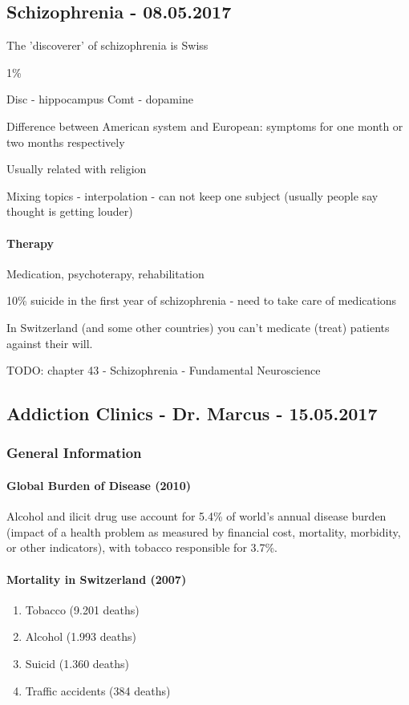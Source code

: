 \documentclass[12pt,article,oneside,a4paper]{memoir}
\begin{document}
\subsection{Schizophrenia - 08.05.2017}

The 'discoverer' of schizophrenia is Swiss

1\%

Disc - hippocampus
Comt - dopamine

Difference between American system and European: symptoms for one month or two months respectively

Usually related with religion

Mixing topics - interpolation - can not keep one subject (usually people say thought is getting louder)

\paragraph{Therapy}
Medication, psychoterapy, rehabilitation

10\% suicide in the first year of schizophrenia - need to take care of medications

In Switzerland (and some other countries) you can't medicate (treat) patients against their will.

TODO: chapter 43 - Schizophrenia - Fundamental Neuroscience
\newpage
\subsection{Addiction Clinics - Dr. Marcus - 15.05.2017}

\subsubsection{General Information}
\paragraph{Global Burden of Disease (2010)} Alcohol and ilicit drug use account for 5.4\% of world's annual disease burden (impact of a health problem as measured by financial cost, mortality, morbidity, or other indicators), with tobacco responsible for 3.7\%.

\paragraph{Mortality in Switzerland (2007)} 
\begin{enumerate}
\item Tobacco (9.201 deaths)
\item Alcohol (1.993 deaths)
\item Suicid (1.360 deaths)
\item Traffic accidents (384 deaths)
\end{enumerate}
\end{document}
